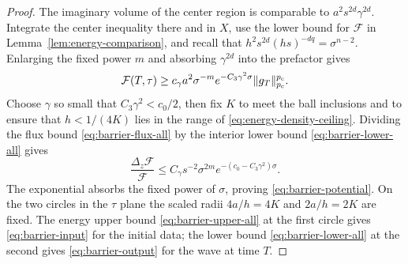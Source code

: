 \begin{proof}
The imaginary volume of the center region is comparable to
$a^2s^{2d}\gamma^{2d}$. Integrate the center inequality there and in
$X$, use the lower bound for $\mathcal F$ in
Lemma~\ref{lem:energy-comparison}, and recall that
$h^2s^{2d}(hs)^{-dq}=\sigma^{n-2}$. Enlarging the fixed power $m$
and absorbing $\gamma^{2d}$ into the prefactor gives
\begin{equation}\label{eq:barrier-lower-all}
 \mathcal F(T,\tau)\ge
 c_\gamma a^2\sigma^{-m}e^{-C_3\gamma^2\sigma}\|g_T\|_{p_{\mathrm c}}^{p_{\mathrm c}}.
\end{equation}
Choose $\gamma$ so small that $C_3\gamma^2<c_0/2$, then fix $K$ to
meet the ball inclusions and to ensure that $h<1/(4K)$ lies in the
range of \eqref{eq:energy-density-ceiling}. Dividing the flux bound
\eqref{eq:barrier-flux-all} by the interior lower bound
\eqref{eq:barrier-lower-all} gives
\[
 \frac{\Delta_z\mathcal F}{\mathcal F}
   \le C_\gamma s^{-2}\sigma^{2m}e^{-(c_0-C_3\gamma^2)\sigma}.
\]
The exponential absorbs the fixed power of $\sigma$, proving
\eqref{eq:barrier-potential}. On the two circles in the $\tau$ plane
the scaled radii $4a/h=4K$ and $2a/h=2K$ are fixed. The energy
upper bound \eqref{eq:barrier-upper-all} at the first circle gives
\eqref{eq:barrier-input} for the initial data; the lower bound
\eqref{eq:barrier-lower-all} at the second gives \eqref{eq:barrier-output}
for the wave at time $T$.
\end{proof}
